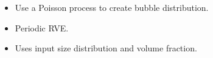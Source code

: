 \documentclass{beamer}
\begin{document}
\begin{frame}
\begin{center}
      \end{center}
      \begin{itemize}[<+-| alert@+>]
        \item Use a Poisson process to create bubble distribution.
        \item Periodic RVE.
        \item Uses input size distribution and volume fraction. 
      \end{itemize}
    \end{frame}
\end{document}
